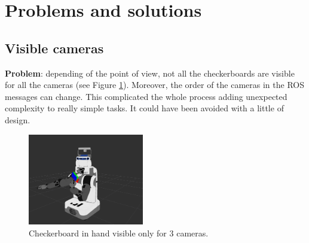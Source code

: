 
%
%


\section{Problems and solutions}

\subsection{Visible cameras}

\textbf{Problem}: depending of the point of view, not all the checkerboards are visible for all the cameras (see Figure \ref{fig:visibility}). Moreover, the order of the cameras in the ROS messages can change. This complicated the whole process adding unexpected complexity to really simple tasks. It could have been avoided with a little of design.

\begin{figure}[!htbp]
 \centering
 \includegraphics[width=0.45\textwidth]{images/screenshots/uncalib05.png}
 \caption{Checkerboard in hand visible only for 3 cameras.}
 \label{fig:visibility}
\end{figure}

